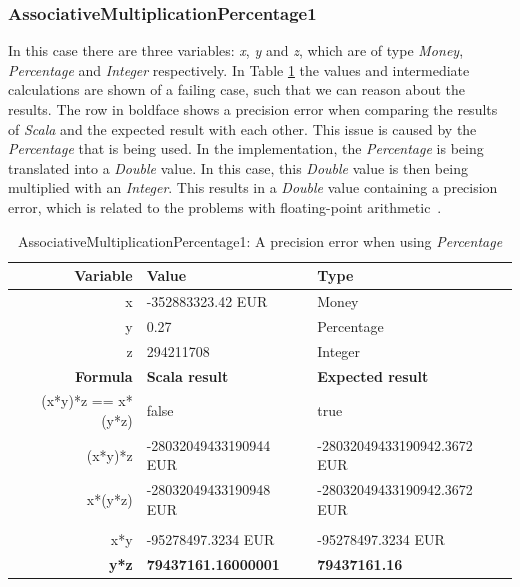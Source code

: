 \subsubsection{AssociativeMultiplicationPercentage1}
In this case there are three variables: \textit{x}, \textit{y} and \textit{z},
which are of type \textit{Money}, \textit{Percentage} and \textit{Integer}
respectively. In Table \ref{ch4_init_check_AssociativeMultiplicationPercentage1}
the values and intermediate calculations are shown of a failing case, such that
we can reason about the results. The row in boldface shows a precision error
when comparing the results of \textit{Scala} and the expected result with each
other. This issue is caused by the \textit{Percentage} that is being used. In
the implementation, the \textit{Percentage} is being translated into a
\textit{Double} value. In this case, this \textit{Double} value is then being
multiplied with an \textit{Integer}. This results in a \textit{Double} value
containing a precision error, which is related to the problems with
floating-point arithmetic~\cite{goldberg1991every}.
\FloatBarrier
\begin{table}[!ht]
\centering
\begin{tabular}{rll}
\hline
\textbf{Variable}  & \textbf{Value}             & \textbf{Type}               \\ \hline
x                  & -352883323.42 EUR          & Money                       \\
y                  & 0.27                       & Percentage                  \\
z                  & 294211708                  & Integer                     \\ \hline
\textbf{Formula}   & \textbf{Scala result}      & \textbf{Expected result}    \\ \hline
(x*y)*z == x*(y*z) & false                      & true                        \\
(x*y)*z            & -28032049433190944 EUR     & -28032049433190942.3672 EUR \\
x*(y*z)            & -28032049433190948 EUR     & -28032049433190942.3672 EUR \\
                   &                            &                             \\
x*y                & -95278497.3234 EUR         & -95278497.3234 EUR          \\
\textbf{y*z}       & \textbf{79437161.16000001} & \textbf{79437161.16}        \\ \hline
\end{tabular}
\caption{AssociativeMultiplicationPercentage1: A precision error when using \textit{Percentage}}
\label{ch4_init_check_AssociativeMultiplicationPercentage1}
\end{table}

